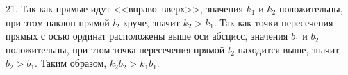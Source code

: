 21. Так как прямые идут <<вправо--вверх>>, значения $k_1$ и $k_2$ положительны, при этом наклон прямой $l_2$ круче, значит $k_2>k_1.$ Так как точки пересечения прямых с осью ординат расположены выше оси абсцисс, значения $b_1$ и $b_2$ положительны, при этом точка пересечения прямой $l_2$ находится выше, значит $b_2>b_1.$ Таким образом, $k_2b_2>k_1b_1.$\\
